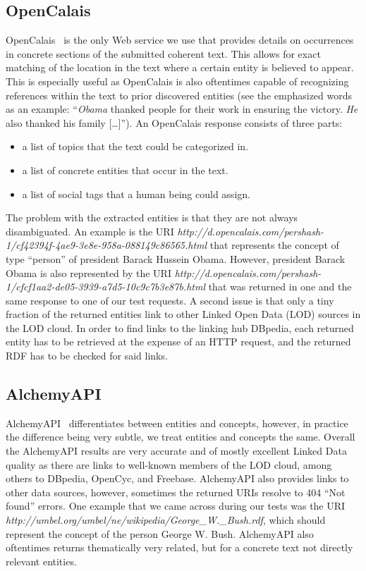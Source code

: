 \subsection{OpenCalais}\label{sec:opencalais}
OpenCalais~\cite{OpenCalais} is the only Web service we use that provides details on occurrences in concrete sections of the submitted coherent text. This allows for exact matching of the location in the text where a certain entity is believed to appear. This is especially useful as OpenCalais is also oftentimes capable of recognizing references within the text to prior discovered entities (see the emphasized words as an example: ``\emph{Obama} thanked people for their work in ensuring the victory. \emph{He} also thanked his family […]''). An OpenCalais response consists of three parts:

\begin{itemize}
\item a list of topics that the text could be categorized in.
\item a list of concrete entities that occur in the text.
\item a list of social tags that a human being could assign.
\end{itemize}

The problem with the extracted entities is that they are not always disambiguated. An example is the URI \textit{http://d.opencalais.com/pershash-1/cf42394f-4ae9-3e8e-958a-088149c86565.html} that represents the concept of type ``person'' of president Barack Hussein Obama. However, president Barack Obama is also represented by the URI \textit{http://d.opencalais.com/pershash-1/cfcf1aa2-de05-3939-a7d5-10c9c7b3e87b.html} that was returned in one and the same response to one of our test requests. A second issue is that only a tiny fraction of the returned entities link to other Linked Open Data (LOD) sources in the LOD cloud. In order to find links to the linking hub DBpedia, each returned entity has to be retrieved at the expense of an HTTP request, and the returned RDF has to be checked for said links.

\subsection{AlchemyAPI}
AlchemyAPI~\cite{AlchemyAPI} differentiates between entities and concepts, however, in practice the difference being very subtle, we treat entities and concepts the same. Overall the AlchemyAPI results are very accurate and of mostly excellent Linked Data quality as there are links to well-known members of the LOD cloud, among others to DBpedia, OpenCyc, and Freebase. AlchemyAPI also provides links to other data sources, however, sometimes the returned URIs resolve to 404 ``Not found'' errors. One example that we came across during our tests was the URI \textit{http://umbel.org/umbel/ne/wikipedia/George\_W.\_Bush.rdf}, which should represent the concept of the person George W. Bush. AlchemyAPI also oftentimes returns thematically very related, but for a concrete text not directly relevant entities.

